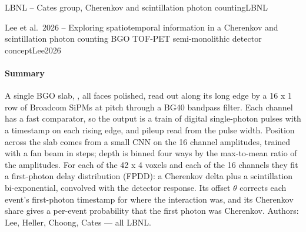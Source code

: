 \begin{programnote}{LBNL -- Cates group, Cherenkov and scintillation photon counting}{LBNL}
\begin{papernote}{Lee et al.\ 2026 -- Exploring spatiotemporal information in a Cherenkov and scintillation photon counting BGO TOF-PET semi-monolithic detector concept}{Lee2026}
\paragraph{Summary}
A single BGO slab, , all faces polished, read
out along its long edge by a 16 x 1 row of  Broadcom
SiPMs at  pitch through a  BG40 bandpass filter. Each channel
has a fast comparator, so the output is a train of digital single-photon
pulses with a timestamp on each rising edge, and pileup read from the pulse
width. Position across the slab comes from a small CNN on the 16 channel
amplitudes, trained with a fan beam in  steps; depth is binned four
ways by the max-to-mean ratio of the amplitudes. For each of the 42 x 4
voxels and each of the 16 channels they fit a first-photon delay distribution
(FPDD): a Cherenkov delta plus a scintillation bi-exponential, convolved with
the detector response. Its offset $\theta$ corrects each event's first-photon
timestamp for where the interaction was, and its Cherenkov share gives a
per-event probability that the first photon was Cherenkov.
Authors: Lee, Heller, Choong, Cates --- all LBNL.


\end{papernote}
\end{programnote}

